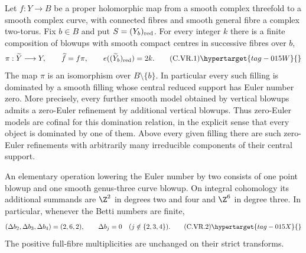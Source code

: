 \begin{proposition}\hypertarget{tag-01DJ}{}\label{cdp:st:C.2.UN.4}

Let $f:Y\to B$ be a proper holomorphic map from a smooth complex
threefold to a smooth complex curve, with connected fibres and smooth
general fibre a complex two-torus. Fix $b\in B$ and put
$S=(Y_b)_{\rm red}$. For every integer $k$ there is a finite composition
of blowups with smooth compact centres in successive fibres over $b$,
\[
 \pi:\widetilde Y\longrightarrow Y,\qquad
 \widetilde f=f\pi,\qquad
 e((\widetilde Y_b)_{\rm red})=2k.                 \tag{C.VR.1}\hypertarget{tag-015W}{}\label{cdp:eq:C.VR.1}
\]
The map $\pi$ is an isomorphism over $B\setminus\{b\}$.
In particular every such filling is dominated by a smooth filling
whose central reduced support has Euler number zero. More precisely,
every further smooth model obtained by vertical blowups admits a
zero-Euler refinement by additional vertical blowups. Thus zero-Euler
models are cofinal for this domination relation, in the explicit sense
that every object is dominated by one of them.
Above every given filling there are such zero-Euler refinements with
arbitrarily many irreducible components of their central support.

An elementary operation lowering the Euler number by two consists of
one point blowup and one smooth genus-three curve blowup. On integral
cohomology its additional summands are $\Z^2$ in degrees two and four
and $\Z^6$ in degree three. In particular, whenever the Betti numbers
are finite,
\[
 (\Delta b_2,\Delta b_3,\Delta b_4)=(2,6,2),
 \qquad \Delta b_j=0\quad(j\notin\{2,3,4\}).       \tag{C.VR.2}\hypertarget{tag-015X}{}\label{cdp:eq:C.VR.2}
\]
The positive full-fibre multiplicities are unchanged on
their strict transforms.
\end{proposition}


